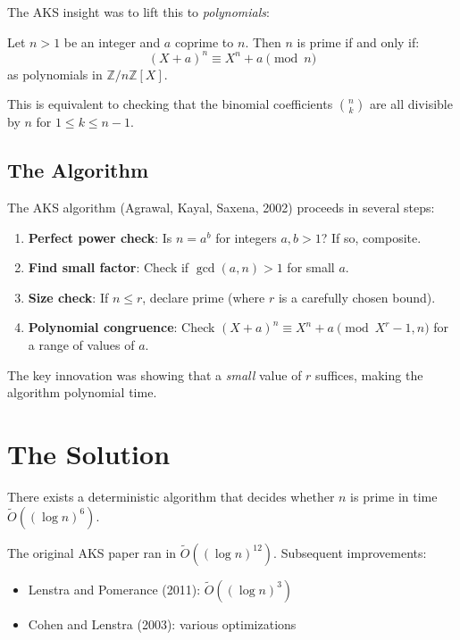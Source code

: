 The AKS insight was to lift this to \emph{polynomials}:

\begin{theorem}
Let $n > 1$ be an integer and $a$ coprime to $n$. Then $n$ is prime if and only if:
\begin{equation}
(X + a)^n \equiv X^n + a \pmod{n}
\end{equation}
as polynomials in $\mathbb{Z}/n\mathbb{Z}[X]$.
\end{theorem}

This is equivalent to checking that the binomial coefficients $\binom{n}{k}$ are all divisible by $n$ for $1 \leq k \leq n-1$.

\subsection{The Algorithm}

The AKS algorithm (Agrawal, Kayal, Saxena, 2002) proceeds in several steps:

\begin{enumerate}
\item \textbf{Perfect power check}: Is $n = a^b$ for integers $a, b > 1$? If so, composite.
\item \textbf{Find small factor}: Check if $\gcd(a, n) > 1$ for small $a$.
\item \textbf{Size check}: If $n \leq r$, declare prime (where $r$ is a carefully chosen bound).
\item \textbf{Polynomial congruence}: Check $(X + a)^n \equiv X^n + a \pmod{X^r - 1, n}$ for a range of values of $a$.
\end{enumerate}

The key innovation was showing that a \emph{small} value of $r$ suffices, making the algorithm polynomial time.

\section{The Solution}

\begin{theorem}
There exists a deterministic algorithm that decides whether $n$ is prime in time $\tilde{O}((\log n)^6)$.
\end{theorem}

The original AKS paper ran in $\tilde{O}((\log n)^{12})$. Subsequent improvements:

\begin{itemize}
\item Lenstra and Pomerance (2011): $\tilde{O}((\log n)^3)$ \cite{lenstra2011}
\item Cohen and Lenstra (2003): various optimizations \cite{bernstein2006}
\end{itemize}

